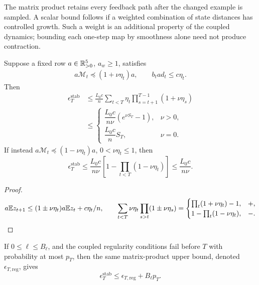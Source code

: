 The matrix product retains every feedback path after the changed example is
sampled. A scalar bound follows if a weighted combination of state distances
has controlled growth. Such a weight is an additional property of the coupled
dynamics; bounding each one-step map by smoothness alone need not produce
contraction.

\begin{corollary}\label{cor:rigid-smallgain}
Suppose a fixed row $a\in\mathbb R_{>0}^5$, $a_w\ge1$, satisfies
\begin{gather}
 a\mathcal M_t\preceq(1+\nu\eta_t)a,\qquad
 b_t a d_t\le c\eta_t.
\end{gather}
Then
\begin{align}
 \epsilon_T^{\mathrm{stab}}
 &\le\frac{L_0c}{n}\sum_{t<T}\eta_t\prod_{s=t+1}^{T-1}(1+\nu\eta_s)\\
 &\le\begin{cases}
 \dfrac{L_0c}{n\nu}(e^{\nu S_T}-1),&\nu>0,\\[2pt]
 \dfrac{L_0c}{n}S_T,&\nu=0.
 \end{cases}
\end{align}
If instead $a\mathcal M_t\preceq(1-\nu\eta_t)a$, $0<\nu\eta_t\le1$, then
\begin{equation}
 \epsilon_T^{\mathrm{stab}}\le\frac{L_0c}{n\nu}
             \left[1-\prod_{t<T}(1-\nu\eta_t)\right]\le\frac{L_0c}{n\nu}.
\end{equation}
\end{corollary}
\begin{proof}
\begin{gather}
 a\mathbb E z_{t+1}\le(1\pm\nu\eta_t)a\mathbb E z_t+c\eta_t/n,\qquad
 \sum_{t<T}\nu\eta_t\prod_{s>t}(1\pm\nu\eta_s)
 =\begin{cases}\prod_t(1+\nu\eta_t)-1,&+,\\1-\prod_t(1-\nu\eta_t),&-.
 \end{cases}
\end{gather}
\end{proof}
\begin{proposition}\label{prop:rigid-exit}
If $0\le\ell\le B_\ell$, and the coupled regularity conditions fail before $T$
with probability at most $p_T$, then the same matrix-product upper bound, denoted
$\epsilon_{T,\mathrm{reg}}$, gives
\begin{equation}
 \epsilon_T^{\mathrm{stab}}\le\epsilon_{T,\mathrm{reg}}+B_\ell p_T.
\end{equation}
\end{proposition}
